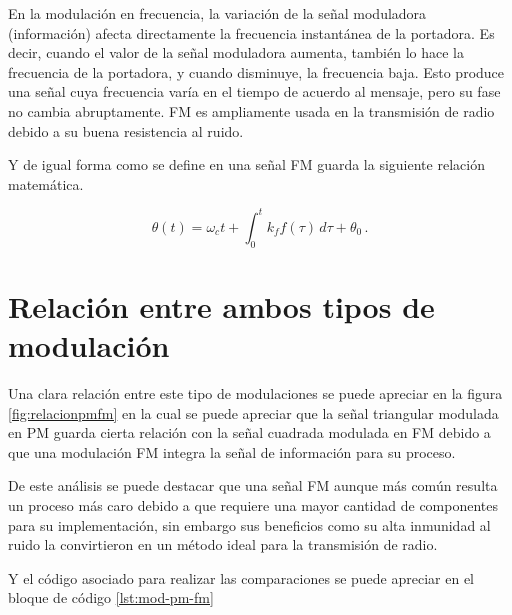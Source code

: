 \documentclass[conference]{IEEEtran}
\begin{document}
	En la modulación en frecuencia, la variación de la señal moduladora (información) afecta directamente la frecuencia instantánea de la portadora. Es decir, cuando el valor de la señal moduladora aumenta, también lo hace la frecuencia de la portadora, y cuando disminuye, la frecuencia baja. Esto produce una señal cuya frecuencia varía en el tiempo de acuerdo al mensaje, pero su fase no cambia abruptamente. FM es ampliamente usada en la transmisión de radio debido a su buena resistencia al ruido.
	
	Y de igual forma como se define en \cite{stremler2006} una señal FM guarda la siguiente relación matemática.
	
	\begin{equation}
		\theta(t) = \omega_c t + \int_0^t k_f f(\tau)\, d\tau + \theta_0\,.
		\label{eq:mod-fm}
	\end{equation}
	
	
	
	\section{Relación entre ambos tipos de modulación}
	
	Una clara relación entre este tipo de modulaciones se puede apreciar en la figura \ref{fig:relacionpmfm} en la cual se puede apreciar que la señal triangular modulada en PM guarda cierta relación con la señal cuadrada modulada en FM debido a que una modulación FM integra la señal de información para su proceso.
	
	De este análisis se puede destacar que una señal FM aunque más común resulta un proceso más caro debido a que requiere una mayor cantidad de componentes para su implementación, sin embargo sus beneficios como su alta inmunidad al ruido la convirtieron en un método ideal para la transmisión de radio.
	
	Y el código asociado para realizar las comparaciones se puede apreciar en el bloque de código \ref{lst:mod-pm-fm}
	
\end{document}
